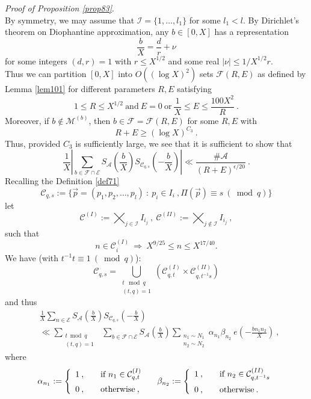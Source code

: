 \documentclass{amsart}
\numberwithin{equation}{subsection}
\begin{document}
\textit{Proof of Proposition \ref{prop83}}.\\
By symmetry, we may assume that $\mathcal{I}=\{1,\ldots, l_1\}$ for some $l_1<l$. By Dirichlet's theorem on Diophantine approximation, any $b\in [0,X]$ has a representation
$$\frac{b}{X}=\frac{d}{r}+\nu$$
for some integers $(d,r)=1$ with $r\leq X^{1/2}$ and some real $|\nu|\leq 1/X^{1/2}r$.\\
Thus we can partition $[0,X]$ into $O((\log X)^2)$ sets $\mathcal{F}(R,E)$ as defined by Lemma \ref{lem101} for different parameters $R,E$ satisfying 
$$1\leq R\leq X^{1/2}\ \text{and}\  E=0\ \text{or}\ \frac{1}{X}\leq E\leq \frac{100X^2}{R}\:.$$
Moreover, if $b\not\in \mathcal{M}^{(b)}$, then $b\in \mathcal{F}=\mathcal{F}(R,E)$ for some $R,E$ with 
$$R+E\geq  (\log X)^{C_3}\:.$$
Thus, provided $C_3$ is sufficiently large, we see that it is sufficient to show that 
\[
\frac{1}{X} \left| \sum_{b\in\mathcal{F}\cap \mathcal{E}} S_{\mathcal{A}}\left(\frac{b}{X}\right) S_{\mathcal{C}_{q,s}}\left(-\frac{b}{X}\right)   \right| \ll \frac{\#\mathcal{A}}{(R+E)^{\epsilon/20}}\:.    \tag{10.1}
\]
Recalling the Definition \ref{def71} 
$$\mathcal{C}_{q,s}:=\{ \vec{p}=(p_1, p_2, \ldots, p_l)\::\: p_i\in I_i\:, \Pi(\vec{p})\equiv s\: (\bmod q)\}$$
let
$$\mathcal{C}^{(I)}:=\bigtimes_{j\in \mathcal{I}} I_{i_j}\:,\ \mathcal{C}^{(II)} :=\bigtimes_{j\not\in \mathcal{I}} I_{i_j}\:, $$
such that
$$n\in \mathcal{C}_i^{(I)}\ \Rightarrow\ X^{9/25}\leq n\leq X^{17/40}.$$
We have (with $t^{-1}t\equiv 1\: (\bmod q)$):
$$\mathcal{C}_{q,s}=\bigcup_{\substack{ t\mod q \\ (t,q)=1 }} (\mathcal{C}_{q,t}^{(I)}\times \mathcal{C}_{q, t^{-1}s}^{(II)})$$
and thus
\begin{align*}
&\frac{1}{X}\sum_{n\in \mathcal{E}} S_{\mathcal{A}}\left(\frac{b}{X}\right)S_{\mathcal{C}_{q,s}}\left(-\frac{b}{X}\right)\\
&\ll \sum_{\substack{t \bmod q \\ (t,q)=1}}\ \ \sum_{b\in \mathcal{F}\cap \mathcal{E}} S_{\mathcal{A}}\left(\frac{b}{X}\right)    \sum_{\substack{n_1\sim N_1 \\ n_2\sim N_2}} \alpha_{n_1}\beta_{n_2}\: e\left(-\frac{bn_1n_2}{X}\right)\:,
\end{align*}
where
\begin{eqnarray}
\alpha_{n_1}:=\left\{ 
  \begin{array}{l l}
    1\:, & \quad \text{if $n_1\in \mathcal{C}_{q,t}^{(I)}$}\vspace{2mm}\\ 
    0\:, & \quad \text{otherwise}\:,\ \ \ \ 
  \end{array} \right.
\nonumber
\beta_{n_2}:=\left\{ 
  \begin{array}{l l}
    1\:, & \quad \text{if $n_2\in \mathcal{C}_{q,t^{-1}s}^{(II)}$}\vspace{2mm}\\ 
    0\:, & \quad \text{otherwise}\:.\\
  \end{array} \right.
\nonumber
\end{eqnarray}
\end{document}
